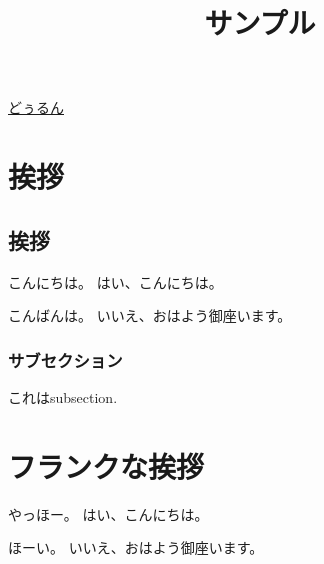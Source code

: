 \documentclass[a4paper,11pt,oneside,openany,report]{jsbook}
\title{サンプル}
\begin{document}
\maketitle
\href{https://twitter.com/NegiIgaiNuki}{どぅるん}

\chapter{挨拶}\label{ch:挨拶}
\section{挨拶}\label{sec:挨拶/挨拶}
こんにちは。
はい、こんにちは。

こんばんは。
いいえ、おはよう御座います。

\subsection{サブセクション}\label{subsec:挨拶/挨拶/サブセクション}
これはsubsection.

\chapter{フランクな挨拶}\label{ch:フランクな挨拶}
やっほー。
はい、こんにちは。

ほーい。
いいえ、おはよう御座います。
\end{document}
